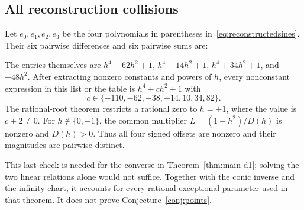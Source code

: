 \subsection{All reconstruction collisions}
Let $e_0,e_1,e_2,e_3$ be the four polynomials in parentheses in~\eqref{eq:reconstructedsines}. Their six pairwise differences and six pairwise sums are:

The entries themselves are $h^4-62h^2+1$, $h^4-14h^2+1$, $h^4+34h^2+1$, and $-48h^2$. After extracting nonzero constants and powers of $h$, every nonconstant expression in this list or the table is $h^4+ch^2+1$ with
\[
 c\in\{-110,-62,-38,-14,10,34,82\}.
\]
The rational-root theorem restricts a rational zero to $h=\pm1$, where the value is $c+2\ne0$. For $h\notin\{0,\pm1\}$, the common multiplier $L=(1-h^2)/D(h)$ is nonzero and $D(h)>0$. Thus all four signed offsets are nonzero and their magnitudes are pairwise distinct.

This last check is needed for the converse in Theorem~\ref{thm:main-d1}; solving the two linear relations alone would not suffice. Together with the conic inverse and the infinity chart, it accounts for every rational exceptional parameter used in that theorem. It does not prove Conjecture~\ref{conj:points}.
